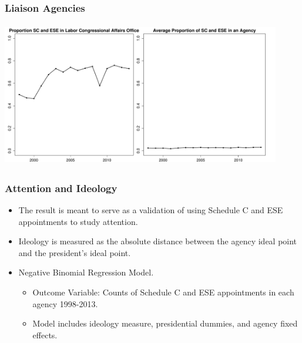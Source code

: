 \documentclass{beamer}
\begin{document}
\begin{frame}
\frametitle{Liaison Agencies}
\begin{center}
\includegraphics[height=2.5in,width=4.8in]{LaborCongressionalAffairs.pdf}
\end{center}
\end{frame}

\begin{frame}
\frametitle{Attention and Ideology}

\begin{itemize}\addtolength{\itemsep}{1.5\baselineskip}
\item The result is meant to serve as a validation of using Schedule C and ESE appointments to study attention. 
\item Ideology is measured as the absolute distance between the agency ideal point and the president's ideal point.
\item Negative Binomial Regression Model.
\begin{itemize}\addtolength{\itemsep}{1\baselineskip}
\item Outcome Variable: Counts of Schedule C and ESE appointments in each agency 1998-2013.
\item Model includes ideology measure, presidential dummies, and agency fixed effects.
\end{itemize}
\end{itemize}
\end{frame}
\end{document}
